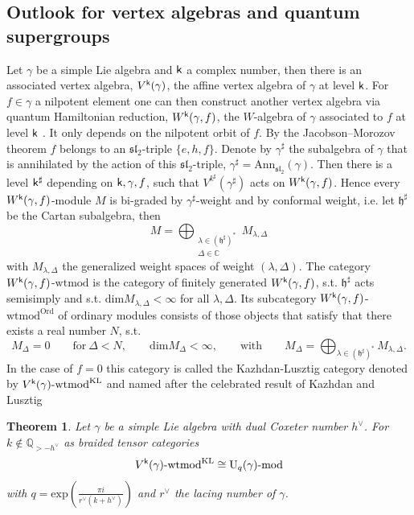 \documentclass[a4paper, reqno]{amsart}
\newtheorem{theorem}{Theorem}[section]
\theoremstyle{introTheorems}
\newcommand\g\gamma
\renewcommand{\1}{\mathbbold{1}}
\begin{document}
\bigskip

\subsection{Outlook for vertex algebras and quantum supergroups}

Let $\g$ be a simple Lie algebra and $\mathsf{k}$ a complex number, then there is an associated vertex algebra, $V^\k(\g)$, the affine vertex algebra of $\g$ at level $\mathsf{k}$. For $f \in \g$ a nilpotent element one can then construct another vertex algebra via quantum Hamiltonian reduction, $W^\k(\g, f)$, the $W$-algebra of $\g$ associated to $f$ at level $\mathsf{k}$ \cite{KacWak}. 
It only depends on the nilpotent orbit of $f$. 
By the Jacobson–Morozov theorem  $f$ belongs to an $\mathfrak{sl}_2$-triple $\{e, h, f\}$. Denote by $\g^\sharp$ the subalgebra of $\g$ that is annihilated by the action of this $\mathfrak{sl}_2$-triple, $\g^\sharp = \text{Ann}_{\mathfrak{sl}_2}(\g)$. Then there is a level $\mathsf{k}^\sharp$ depending on $\k, \g, f$, such that $V^{k^\sharp}(\g^\sharp)$ acts on $W^\k(\g, f)$. Hence every $W^\k(\g, f)$-module $M$ is bi-graded by $\g^\sharp$-weight and by conformal weight, i.e. let $\mathfrak{h}^\sharp$ be the Cartan subalgebra, then
\[
M = \bigoplus_{\substack{\lambda \in (\mathfrak{h}^{\sharp})^* \\ \Delta \in \mathbb C}} M_{\lambda, \Delta}
\]
with $M_{\lambda, \Delta}$ the generalized weight spaces of weight $(\lambda, \Delta)$. 
The category $W^\k(\g, f)$-$\text{wtmod}$ is the category of finitely generated $W^\k(\g, f)$, s.t. $\mathfrak{h}^\sharp$ acts semisimply and s.t. $\text{dim} M_{\lambda, \Delta} < \infty$ for all $\lambda, \Delta$. 
Its  subcategory $W^\k(\g, f)$-$\text{wtmod}^{\text{Ord}}$ of ordinary modules consists of those objects that satisfy that there exists a real number $N$, s.t. 
\[
M_\Delta = 0 \qquad \text{for} \ \Delta < N, \qquad \text{dim} M_\Delta < \infty, \qquad \text{with} \qquad M_\Delta = \bigoplus_{\lambda \in (\mathfrak{h}^{\sharp})^* } M_{\lambda, \Delta}.
\]
In the case of $f=0$ this category is called the Kazhdan-Lusztig category denoted by $V^\k(\g)\text{-}\mathrm{wtmod}^{\mathrm{KL}}$ and named after the celebrated result of Kazhdan and Lusztig
\begin{theorem} \cites{KL93a, KL93b, KL93c}
Let $\g$ be a simple Lie algebra with dual Coxeter number $h^\vee$. For $k \notin \mathbb Q_{>-h^\vee}$  as braided tensor categories
\[
V^\k(\g)\text{-}\mathrm{wtmod}^{\mathrm{KL}} \cong \Uq(\g)\text{-}\mathrm{mod}
\]
with $q = \mathrm{exp}\left({\frac{\pi i}{r^\vee(k+h^\vee)}}\right)$ and $r^\vee$ the lacing number of $\g$.
\end{theorem}
\end{document}
